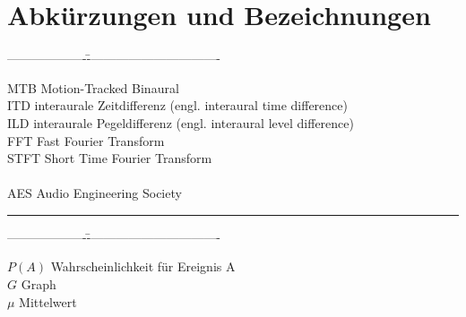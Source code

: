 \chapter*{Abkürzungen und Bezeichnungen}

\thispagestyle{empty}													%

\begin{tabbing}
-------------------\=--------------------------------\kill


MTB     \>Motion-Tracked Binaural\\
ITD     \>interaurale Zeitdifferenz (engl. interaural time difference)\\
ILD     \>interaurale Pegeldifferenz (engl. interaural level difference)\\
FFT     \>Fast Fourier Transform\\
STFT    \>Short Time Fourier Transform\\
\\
AES     \>Audio Engineering Society\\



\end{tabbing}

\rule{10cm}{.3mm}

\begin{tabbing}
-------------------\=--------------------------------\kill

$P(A)$      \>Wahrscheinlichkeit für Ereignis A\\
$G$         \>Graph\\
$\mu$       \>Mittelwert\\

\end{tabbing}
